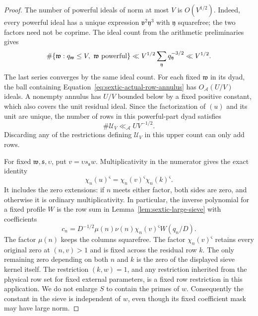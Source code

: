 \documentclass[11pt,a4paper]{article}
\numberwithin{equation}{section}
\numberwithin{figure}{section}
\theoremstyle{definition}
\theoremstyle{remark}
\begin{document}
\begin{proof}
The number of powerful ideals of norm at most $V$ is $O(V^{1/2})$.
Indeed, every powerful ideal has a unique expression
$\mathfrak v^2\mathfrak y^3$ with $\mathfrak y$ squarefree; the two
factors need not be coprime.  The ideal count from the arithmetic
preliminaries gives
\[
 \#\{\mathfrak w:q_{\mathfrak w}\le V,\ \mathfrak w\ {\rm powerful}\}
 \ll V^{1/2}\sum_{\mathfrak y}q_{\mathfrak y}^{-3/2}
 \ll V^{1/2}.
\]
The last series converges by the same ideal count.  For each fixed
$\mathfrak w$ in its dyad, the ball containing
Equation~\eqref{eq:sextic-actual-row-annulus} has $O_{\mathcal A}(U/V)$
ideals.  A nonempty annulus has $U/V$ bounded below by a fixed positive
constant, which also covers the unit residual ideal.  Since the
factorization of $(u)$ and its unit are unique, the number of rows in
this powerful-part dyad satisfies
\begin{equation}\label{eq:sextic-stratum-cardinality}
 \#\mathcal U_V\ll_{\mathcal A}U V^{-1/2}.
\end{equation}
Discarding any of the restrictions defining $\mathcal U_V$ in this upper
count can only add rows.

For fixed $\mathfrak w,\mathfrak s,\upsilon$, put
$v=\upsilon s_{\mathfrak s}w$.  Multiplicativity in the numerator gives
the exact identity
\begin{equation}\label{eq:sextic-frozen-mask}
 \chi_n(u)^{\varsigma}
   =\chi_n(v)^{\varsigma}\chi_n(k)^{\varsigma}.
\end{equation}
It includes the zero extensions: if $n$ meets either factor, both sides
are zero, and otherwise it is ordinary multiplicativity.  In particular,
the inverse polynomial for a fixed profile $W$ is the row sum in
Lemma~\ref{lem:sextic-large-sieve} with coefficients
\[
 c_n=D^{-1/2}\mu(n)\nu(n)\chi_n(v)^{\varsigma}W(q_n/D).
\]
The factor $\mu(n)$ keeps the columns squarefree.  The factor
$\chi_n(v)^{\varsigma}$ retains every original zero at $(n,v)>1$ and is
fixed across the residual row $k$.  The only remaining zero depending on
both $n$ and $k$ is the zero of the displayed sieve kernel itself.  The
restriction $(k,w)=1$, and any restriction inherited from the physical
row set for fixed external parameters, is a fixed row restriction in this
application.  We do not enlarge $S$ to contain the primes of $w$.
Consequently the constant in the sieve is independent of $w$, even though
its fixed coefficient mask may have large norm.


\end{proof}
\end{document}
